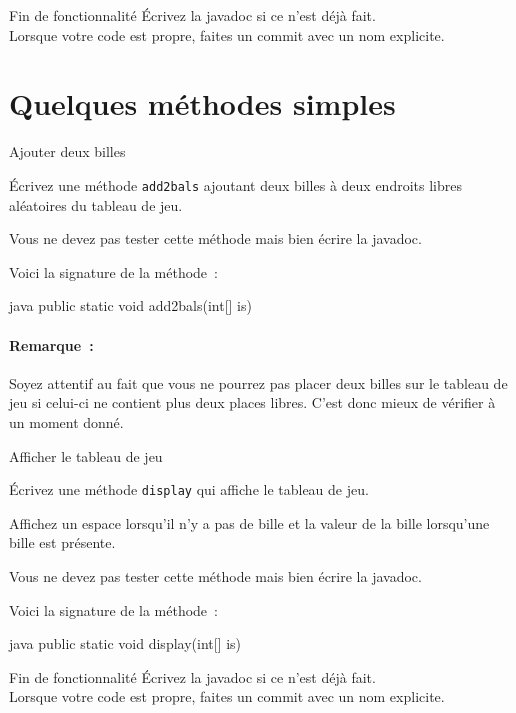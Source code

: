 \documentclass[a4paper,11pt]{style-esi/td}
\newcommand{\findefonctionnalite}{
\begin{infoit}{Fin de fonctionnalité}
	Écrivez la javadoc si ce n'est déjà fait.\\  
	Lorsque votre code est propre, faites un commit avec un nom explicite. 
\end{infoit}
}
\begin{document}
\findefonctionnalite




\section{Quelques méthodes simples}

\begin{Exercice}{Ajouter deux billes}
	\begin{steps}
		\item Écrivez une méthode \texttt{add2bals} ajoutant deux billes à deux 
			endroits libres aléatoires du tableau de jeu. 
	\end{steps}

	Vous ne devez pas tester cette méthode mais bien écrire la javadoc. 

	Voici la signature de la méthode~:

	\begin{Code}{java}
		public static void add2bals(int[] is)
	\end{Code}

	\paragraph{Remarque~:} Soyez attentif au fait que vous ne pourrez pas placer 
	deux billes sur le tableau de jeu si celui-ci ne contient plus deux places 
	libres. C'est donc mieux de vérifier à un moment donné. 

\end{Exercice}

\begin{Exercice}{Afficher le tableau de jeu}
	\begin{steps}
		\item Écrivez une méthode \texttt{display} qui affiche le tableau de jeu. 
	\end{steps}

	Affichez un espace lorsqu'il n'y a pas de bille et la valeur de la bille
	lorsqu'une bille est présente. 

	Vous ne devez pas tester cette méthode mais bien écrire la javadoc.

	Voici la signature de la méthode~:
	\begin{Code}{java}
		public static void display(int[] is)
	\end{Code}

\end{Exercice}

\findefonctionnalite
\end{document}
